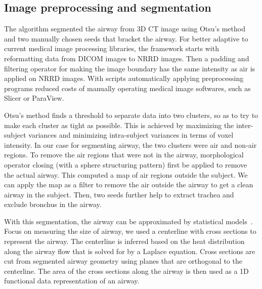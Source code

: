 \subsection{Image preprocessing and segmentation}
\label{sec:image_preprocessing_and_segmentation}
The algorithm segmented the airway from 3D CT image using Otsu's method and two manually chosen seeds that bracket the airway.
For better adaptive to current medical image processing libraries, the framework starts with reformatting data from DICOM images to NRRD images.
Then a padding and filtering operator for making the image boundary has the same intensity as air is applied on NRRD images.
With scripts automatically applying preprocessing programs reduced costs of manually operating medical image softwares, such as Slicer or ParaView.

Otsu's method finds a threshold to separate data into two clusters, so as to try to make each cluster as tight as possible.
This is achieved by maximizing the inter-subject variances and minimizing intra-subject variances in terms of voxel intensity.
In our case for segmenting airway, the two clusters were air and non-air regions.
To remove the air regions that were not in the airway, morphological operator closing (with a sphere structuring pattern) first be applied to remove the actual airway.
This computed a map of air regions outside the subject.
We can apply the map as a filter to remove the air outside the airway to get a clean airway in the subject.
Then, two seeds further help to extract trachea and exclude bronchus in the airway.

With this segmentation, the airway can be approximated by statistical models~\cite{pizer2013nested}.
Focus on measuring the size of airway, we used a centerline with cross sections to represent the airway.
The centerline is inferred based on the heat distribution along the airway flow that is solved for by a Laplace equation.
Cross sections are cut from segmented airway geometry using planes that are orthogonal to the centerline. 
The area of the cross sections along the airway is then used as a 1D functional data representation of an airway.

